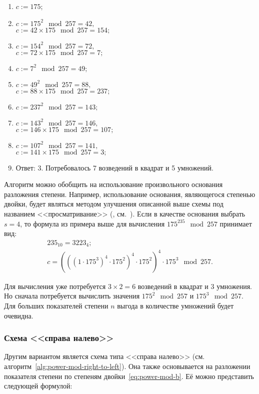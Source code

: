 \begin{enumerate}
	\item $c := 175$;
	\item $c := 175^2 \mod 257 = 42, $\\
		$c := 42 \times 175 \mod 257 = 154;$
	\item $c := 154^2 \mod 257 = 72, $\\
		$c := 72 \times 175 \mod 257 = 7;$
	\item $c := 7^2 \mod 257 = 49; $
	\item $c := 49^2 \mod 257 = 88, $\\
		$c := 88 \times 175 \mod 257 = 237;$
	\item $c := 237^2 \mod 257 = 143; $
	\item $c := 143^2 \mod 257 = 146, $\\
		$c := 146 \times 175 \mod 257 = 107;$
	\item $c := 107^2 \mod 257 = 141, $\\
		$c := 141 \times 175 \mod 257 = 3;$
	\item Ответ: 3. Потребовалось 7 возведений в квадрат и 5 умножений.
\end{enumerate}
\exampleend

Алгоритм можно обобщить на использование произвольного основания разложения степени. Например, использование основания, являющегося степенью двойки, будет являться методом улучшения описанной выше схемы под названием <<просматривание>> (, см.~\cite[9.3.2. Улучшение схем возведение в степень]{Crandall:Pomerance:2011}). Если в качестве основания выбрать $s = 4$, то формула из примера выше для вычисления $175^{235} \mod 257$ принимает вид:
\[\begin{array}{l}
	235_{10} = 3223_{4}; \\
	c = \left(\left(\left( 1 \cdot 175^3 \right)^4 \cdot 175^2 \right)^4 \cdot 175^2 \right)^4 \cdot 175^3 \mod 257.
\end{array}\]

Для вычисления уже потребуется $3 \times 2 = 6$ возведений в квадрат и $3$ умножения. Но сначала потребуется вычислить значения $175^2 \mod 257$ и $175^3 \mod 257$. Для больших показателей степени $n$ выгода в количестве умножений будет очевидна.

\subsubsection{Схема <<справа налево>>}
Другим вариантом является схема типа <<справа налево>> (см. алгоритм~\ref{alg:power-mod-right-to-left}). Она также основывается на разложении показателя степени по степеням двойки~\ref{eq:power-mod-b}. Её можно представить следующей формулой:

